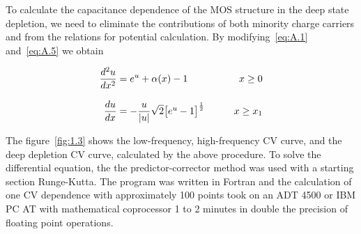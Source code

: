 To calculate the capacitance dependence of the MOS structure in the
deep state depletion, we need to eliminate the contributions of both
minority charge carriers and from the relations for potential
calculation. By modifying~\ref{eq:A.1} and~\ref{eq:A.5} we obtain

\begin{samepage}
  \begin{subequations}\label{eq:A.14}
    \begin{align}
    \frac{d^2u}{dx^2} &= {e^u + \alpha(x)-1} \qquad &{x\ge0}                                     \label{eq:A.14a} \\[0.3cm]
    \frac{du}{dx} &= -\frac{u}{|u|} \sqrt{2} \big{[e^u-1\big]}^{\frac{1}{2}} \qquad &{x\ge{x_1}} \label{eq:A.14b}
    \end{align}
  \end{subequations}
\end{samepage}

The figure~\ref{fig:1.3} shows the low-frequency, high-frequency CV
curve, and the deep depletion CV curve, calculated by the above
procedure. To solve the differential equation, the the
predictor-corrector method was used with a starting section
Runge-Kutta. The program was written in Fortran and the calculation of
one CV dependence with approximately 100 points took on an ADT 4500 or
IBM PC AT with mathematical coprocessor 1 to 2 minutes in double the
precision of floating point operations.
